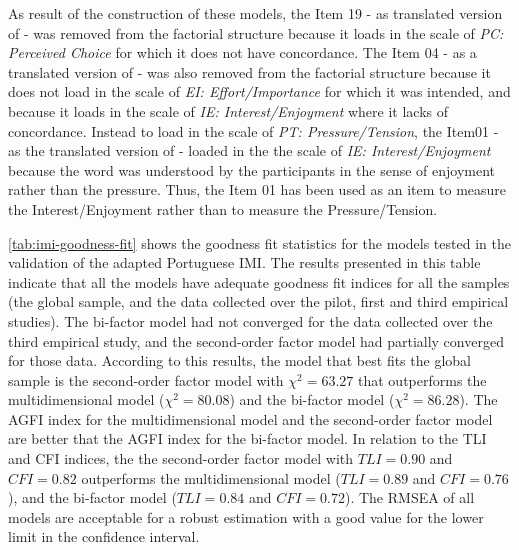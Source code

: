 As result of the construction of these models, the Item 19 -  as translated version of  - was removed from the factorial structure because it loads in  the scale of \emph{PC: Perceived Choice} for which it does not have concordance. The Item 04 -  as a translated version of  - was also removed from the factorial structure because it does not load in the scale of \emph{EI: Effort/Importance} for which it was intended, and because it loads in the scale of \emph{IE: Interest/Enjoyment} where it lacks of concordance. Instead to load in the scale of \emph{PT: Pressure/Tension}, the Item01 -  as the translated version of  - loaded in the the scale of \emph{IE: Interest/Enjoyment} because the word  was understood by the participants in the sense of enjoyment rather than the pressure. Thus, the Item 01 has been used as an item to measure the Interest/Enjoyment rather than to measure the Pressure/Tension.

\autoref{tab:imi-goodness-fit} shows the goodness fit statistics for the models tested in the validation of the adapted Portuguese IMI. The results presented in this table indicate that all the models have adequate goodness fit indices for all the samples (the global sample, and the data collected over the pilot, first and third empirical studies). The bi-factor model had not converged for the data collected over the third empirical study, and the second-order factor model had partially converged for those data. According to this results, the model that best fits the global sample is the second-order factor model with ${\chi}^2 = 63.27$ that outperforms the multidimensional model (${\chi}^2 = 80.08$) and the bi-factor model (${\chi}^2 = 86.28$). The AGFI index for the multidimensional model and the second-order factor model are better that the AGFI index for the bi-factor model. In relation to the TLI and CFI indices, the the second-order factor model with $TLI = 0.90$ and $CFI = 0.82$ outperforms the multidimensional model ($TLI = 0.89$ and $CFI = 0.76$), and the bi-factor model ($TLI = 0.84$ and $CFI = 0.72$). The RMSEA of all models are acceptable for a robust estimation with a good value for the lower limit in the confidence interval.

